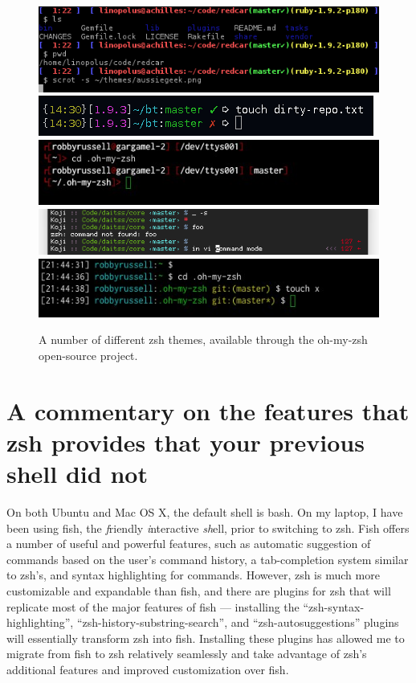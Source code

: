 \documentclass[12pt,a4paper]{article}
\begin{document}
		\begin{figure}[ht!]
			\includegraphics[scale=0.90]{Lab1Images/themes/aussiegeek.png}
			\includegraphics[resolution=72, scale=0.75]{Lab1Images/themes/crunch.png}
			\includegraphics[scale=0.90]{Lab1Images/themes/darkblood.jpg}
			\includegraphics[resolution=72, scale=0.75]{Lab1Images/themes/flazz.png}
			\includegraphics[scale=0.90]{Lab1Images/themes/geoffgarside.jpg}
			\caption{A number of different zsh themes, available through the oh-my-zsh open-source project.}
			\label{themes}
		\end{figure}

	\section{A commentary on the features that zsh provides that your previous shell did not}

		On both Ubuntu and Mac OS X, the default shell is bash. On my laptop, I have been using fish, the \textit{f}riendly \textit{i}nteractive \textit{sh}ell, prior to switching to zsh. Fish offers a number of useful and powerful features, such as automatic suggestion of commands based on the user's command history, a tab-completion system similar to zsh's, and syntax highlighting for commands. However, zsh is much more customizable and expandable than fish, and there are plugins for zsh that will replicate most of the major features of fish --- installing the ``zsh-syntax-highlighting'', ``zsh-history-substring-search'', and ``zsh-autosuggestions'' plugins will essentially transform zsh into fish. Installing these plugins has allowed me to migrate from fish to zsh relatively seamlessly and take advantage of zsh's additional features and improved customization over fish.
\end{document}
